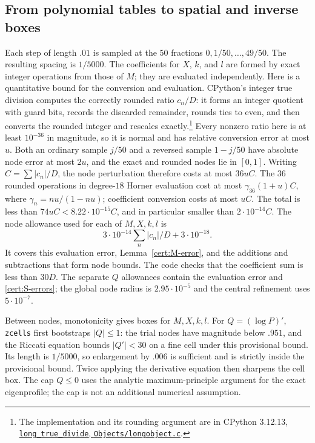 \documentclass[11pt,a4paper]{article}
\numberwithin{equation}{section}
\theoremstyle{definition}
\theoremstyle{remark}
\begin{document}
\subsection{From polynomial tables to spatial and inverse boxes}\label{cert:boxes}

Each step of length $.01$ is sampled at the $50$ fractions
$0,1/50,\ldots,49/50$.  The resulting spacing is $1/5000$.
The coefficients for $X$, $k$, and $l$ are formed by exact integer operations
from those of $M$; they are evaluated independently.  Here is a quantitative
bound for the conversion and evaluation.  CPython's integer true division
computes the correctly rounded ratio $c_n/D$: it forms an integer quotient
with guard bits, records the discarded remainder, rounds ties to even, and
then converts the rounded integer and rescales exactly.\footnote{The
implementation and its rounding argument are in CPython 3.12.13,
\href{https://github.com/python/cpython/blob/v3.12.13/Objects/longobject.c}{\texttt{long\_true\_divide}, \texttt{Objects/longobject.c}}.}
Every nonzero ratio here is at least $10^{-36}$ in magnitude, so it is normal
and has relative conversion error at most $u$.  Both an ordinary sample
$j/50$ and a reversed sample $1-j/50$ have absolute node error at most $2u$,
and the exact and rounded nodes lie in $[0,1]$.  Writing
$C=\sum|c_n|/D$, the node perturbation therefore costs at most $36uC$.
The $36$ rounded operations in degree-$18$ Horner evaluation cost at most
$\gamma_{36}(1+u)C$, where $\gamma_n=nu/(1-nu)$; coefficient conversion
costs at most $uC$.  The total is less than $74uC<8.22\cdot10^{-15}C$,
and in particular smaller than $2\cdot10^{-14}C$.
The node allowance used for each of $M,X,k,l$ is
\begin{equation}\label{cert:node-error}
 3\cdot10^{-14}\sum_n|c_n|/D+3\cdot10^{-18}.
\end{equation}
It covers this evaluation error, Lemma~\ref{cert:M-error}, and the additions
and subtractions that form node bounds.  The code checks that the coefficient
sum is less than $30D$.  The separate $Q$ allowances contain the evaluation
error and \eqref{cert:S-errors}; the global node radius is
$2.95\cdot10^{-5}$ and the central refinement uses $5\cdot10^{-7}$.

Between nodes, monotonicity gives boxes for $M,X,k,l$.  For $Q=(\log P)'$,
\texttt{zcells} first bootstraps $|Q|\le1$: the trial nodes have magnitude
below $.951$, and the Riccati equation bounds $|Q'|<30$ on a fine cell under
this provisional bound.  Its length is $1/5000$, so enlargement by $.006$
is sufficient and is strictly inside the provisional bound.
Twice applying the derivative equation then sharpens the cell box.
The cap $Q\le0$ uses the analytic maximum-principle argument for the exact
eigenprofile; the cap is not an additional numerical assumption.
\end{document}
